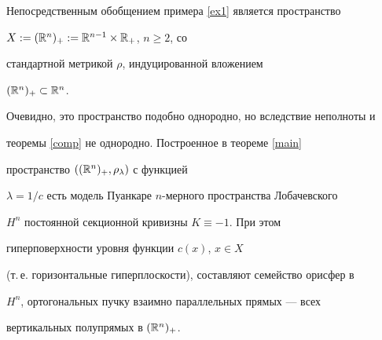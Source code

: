\begin{exams}


\label{ex2}


Непосредственным обобщением примера \ref{ex1} является пространство


$X:=(\Bbb{R}^{n})_{+}:=\Bbb{R}^{n-1} \times \Bbb{R}_{+}$, $n \geq 2$, со


стандартной метрикой $\rho$, индуцированной вложением


$(\Bbb{R}^{n})_{+} \subset \Bbb{R}^{n}$.


Очевидно, это пространство подобно однородно, но вследствие неполноты и


теоремы \ref{comp} не однородно. Построенное в теореме \ref{main}


пространство $((\Bbb{R}^{n})_{+},\rho_{\lambda})$ с функцией


$\lambda =1/c$ есть модель Пуанкаре $n$-мерного пространства Лобачевского


$H^{n}$ постоянной секционной кривизны $K \equiv -1$. При этом


гиперповерхности уровня функции $c(x)$, $x \in X$


(т.\,е. горизонтальные гиперплоскости), составляют семейство орисфер в


$H^{n}$, ортогональных пучку взаимно параллельных прямых --- всех


вертикальных полупрямых в $(\Bbb{R}^{n})_{+}$.


\end{exams}





